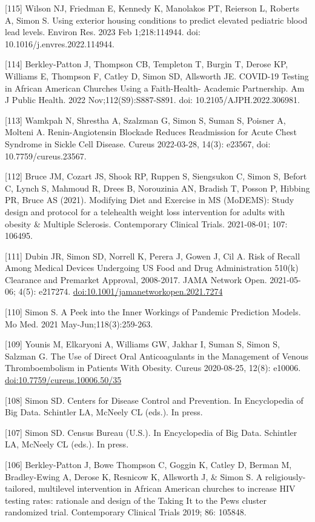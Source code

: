 \documentclass[
  12pt,
]{article}
\begin{document}
{[}115{]} Wilson NJ, Friedman E, Kennedy K, Manolakos PT, Reierson L,
Roberts A, Simon S. Using exterior housing conditions to predict
elevated pediatric blood lead levels. Environ Res. 2023 Feb
1;218:114944. doi: 10.1016/j.envres.2022.114944.

{[}114{]} Berkley-Patton J, Thompson CB, Templeton T, Burgin T, Derose
KP, Williams E, Thompson F, Catley D, Simon SD, Allsworth JE. COVID-19
Testing in African American Churches Using a Faith-Health- Academic
Partnership. Am J Public Health. 2022 Nov;112(S9):S887-S891. doi:
10.2105/AJPH.2022.306981.

{[}113{]} Wamkpah N, Shrestha A, Szalzman G, Simon S, Suman S, Poisner
A, Molteni A. Renin-Angiotensin Blockade Reduces Readmission for Acute
Chest Syndrome in Sickle Cell Disease. Cureus 2022-03-28, 14(3): e23567,
doi: 10.7759/cureus.23567.

{[}112{]} Bruce JM, Cozart JS, Shook RP, Ruppen S, Siengsukon C, Simon
S, Befort C, Lynch S, Mahmoud R, Drees B, Norouzinia AN, Bradish T,
Posson P, Hibbing PR, Bruce AS (2021). Modifying Diet and Exercise in MS
(MoDEMS): Study design and protocol for a telehealth weight loss
intervention for adults with obesity \& Multiple Sclerosis. Contemporary
Clinical Trials. 2021-08-01; 107: 106495.

{[}111{]} Dubin JR, Simon SD, Norrell K, Perera J, Gowen J, Cil A. Risk
of Recall Among Medical Devices Undergoing US Food and Drug
Administration 510(k) Clearance and Premarket Approval, 2008-2017. JAMA
Network Open. 2021-05-06; 4(5): e217274.
\url{doi:10.1001/jamanetworkopen.2021.7274}

{[}110{]} Simon S. A Peek into the Inner Workings of Pandemic Prediction
Models. Mo Med. 2021 May-Jun;118(3):259-263.

{[}109{]} Younis M, Elkaryoni A, Williams GW, Jakhar I, Suman S, Simon
S, Salzman G. The Use of Direct Oral Anticoagulants in the Management of
Venous Thromboembolism in Patients With Obesity. Cureus 2020-08-25,
12(8): e10006. \url{doi:10.7759/cureus.10006.50/35}

{[}108{]} Simon SD. Centers for Disease Control and Prevention. In
Encyclopedia of Big Data. Schintler LA, McNeely CL (eds.). In press.

{[}107{]} Simon SD. Census Bureau (U.S.). In Encyclopedia of Big Data.
Schintler LA, McNeely CL (eds.). In press.

{[}106{]} Berkley-Patton J, Bowe Thompson C, Goggin K, Catley D, Berman
M, Bradley-Ewing A, Derose K, Resnicow K, Allsworth J, \& Simon S. A
religiously-tailored, multilevel intervention in African American
churches to increase HIV testing rates: rationale and design of the
Taking It to the Pews cluster randomized trial. Contemporary Clinical
Trials 2019; 86: 105848.
\end{document}
